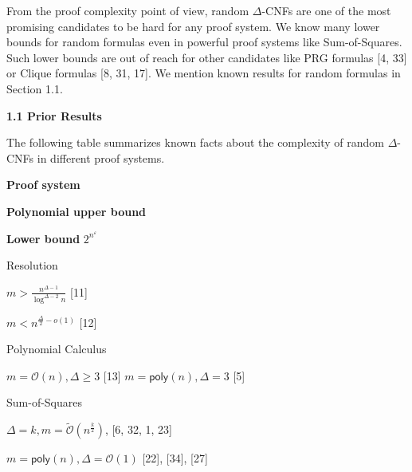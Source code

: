 From the proof complexity point of view, random $\Delta$-CNFs are one of the most promising candidates to
be hard for any proof system. We know many lower bounds for random formulas even in powerful proof
systems like Sum-of-Squares. Such lower bounds are out of reach for other candidates like PRG formulas
[4, 33] or Clique formulas [8, 31, 17]. We mention known results
for random formulas in Section 1.1.\par





\par\medskip\noindent\textbf{
1.1 Prior Results}\par




The following table summarizes known facts about the complexity of random $\Delta$-CNFs in different
proof systems.

\par






\textbf{Proof system}




\textbf{Polynomial upper bound}




\textbf{Lower bound} $2^{n^{\varepsilon}}$








Resolution




$m>\frac{n^{\Delta-1}}{\log^{\Delta-2}n}$ [11]




$m<n^{\frac{\Delta}{2}-o(1)}$ [12]






Polynomial Calculus





$m=\mathcal{O}\left(n\right),\Delta\geq 3$ [13]
$m={\mathsf{poly}}(n),\Delta=3$ [5]






Sum-of-Squares




$\Delta=k,m=\widetilde{\mathcal{O}}(n^{\frac{k}{2}})$,
[6, 32, 1, 23]




$m={\mathsf{poly}}(n),\Delta=\mathcal{O}\left(1\right)$ [22], [34], [27]






